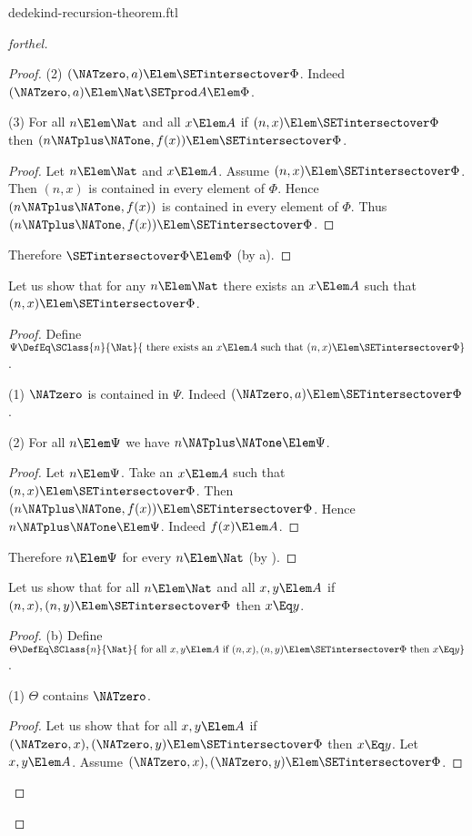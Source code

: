 \documentclass{stex}
\begin{document}
\begin{smodule}{dedekind-recursion-theorem.ftl}
\begin{proof}[forthel]
\begin{proof}
    (2) $(\NATzero, a) \Elem \SETintersectover \Phi$.
    Indeed $(\NATzero, a) \Elem \Nat \SETprod A \Elem \Phi$.

    (3) For all $n \Elem \Nat$ and all $x \Elem A$ if $(n, x) \Elem
    \SETintersectover \Phi$ then $(n \NATplus \NATone, f(x)) \Elem \SETintersectover \Phi$.
    \begin{proof}
      Let $n \Elem \Nat$ and $x \Elem A$.
      Assume $(n, x) \Elem \SETintersectover \Phi$.
      Then $(n, x)$ is contained in every element of $\Phi$.
      Hence $(n \NATplus \NATone, f(x))$ is contained in every element of $\Phi$.
      Thus $(n \NATplus \NATone, f(x)) \Elem \SETintersectover \Phi$.
    \end{proof}

    Therefore $\SETintersectover \Phi \Elem \Phi$ (by a).
  \end{proof}

  Let us show that for any $n \Elem \Nat$ there exists an $x \Elem A$ such
  that $(n, x) \Elem \SETintersectover \Phi$.
  \begin{proof}
    Define $\Psi \DefEq \SClass{n}{\Nat}{\text{ there exists an }x \Elem A\text{ such
    that }(n, x) \Elem \SETintersectover \Phi}$.

    (1) $\NATzero$ is contained in $\Psi$.
    Indeed $(\NATzero, a) \Elem \SETintersectover \Phi$.

    (2) For all $n \Elem \Psi$ we have $n \NATplus \NATone \Elem \Psi$.
    \begin{proof}
      Let $n \Elem \Psi$.
      Take an $x \Elem A$ such that $(n, x) \Elem \SETintersectover \Phi$.
      Then $(n \NATplus \NATone, f(x)) \Elem \SETintersectover \Phi$.
      Hence $n \NATplus \NATone \Elem \Psi$.
      Indeed $f(x) \Elem A$.
    \end{proof}

    Therefore $n \Elem \Psi$ for every $n \Elem \Nat$ (by ).
  \end{proof}

  Let us show that for all $n \Elem \Nat$ and all $x, y \Elem A$ if
  $(n, x), (n, y) \Elem \SETintersectover \Phi$ then $x \Eq y$.
  \begin{proof}
    (b) Define $\Theta \DefEq \SClass{n}{\Nat}{\text{ for all }x, y \Elem A\text{ if }
    (n, x), (n, y) \Elem \SETintersectover \Phi\text{ then }x \Eq y}$.

    (1) $\Theta$ contains $\NATzero$.
    \begin{proof}
      Let us show that for all $x, y \Elem A$ if $(\NATzero, x), (\NATzero, y) \Elem
      \SETintersectover \Phi$ then $x \Eq y$.
        Let $x, y \Elem A$.
        Assume $(\NATzero, x), (\NATzero, y) \Elem \SETintersectover \Phi$.


\end{proof}
\end{proof}
\end{proof}
\end{smodule}
\end{document}
